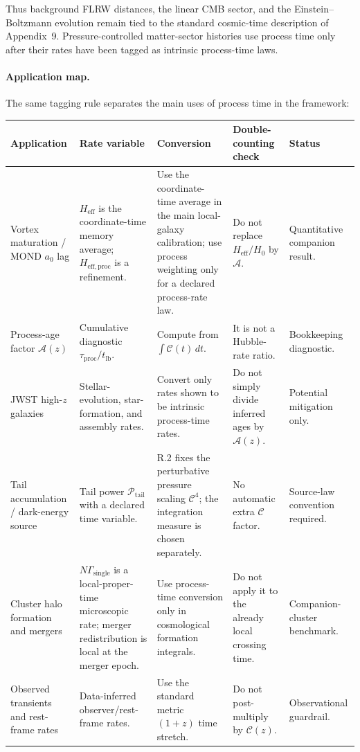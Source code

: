 \documentclass[11pt]{article}
\begin{document}
Thus background FLRW distances, the linear CMB sector, and the
Einstein--Boltzmann evolution remain tied to the standard cosmic-time
description of Appendix~9.  Pressure-controlled matter-sector histories
use process time only after their rates have been tagged as intrinsic
process-time laws.

\paragraph{Application map.}
The same tagging rule separates the main uses of process time in the
framework:
\begin{center}
\small
\begin{tabular}{@{}p{}p{}p{}p{}p{}@{}}
\hline
\textbf{Application} & \textbf{Rate variable} & \textbf{Conversion} & \textbf{Double-counting check} & \textbf{Status} \\
\hline
Vortex maturation / MOND $a_0$ lag &
$H_{\mathrm{eff}}$ is the coordinate-time memory average; $H_{\mathrm{eff,proc}}$ is a refinement. &
Use the coordinate-time average in the main local-galaxy calibration; use process weighting only for a declared process-rate law. &
Do not replace $H_{\mathrm{eff}}/H_0$ by $\mathcal{A}$. &
Quantitative companion result. \\
Process-age factor $\mathcal{A}(z)$ &
Cumulative diagnostic $\tau_{\mathrm{proc}}/t_{\mathrm{lb}}$. &
Compute from $\int \mathcal{C}(t)\,dt$. &
It is not a Hubble-rate ratio. &
Bookkeeping diagnostic. \\
JWST high-$z$ galaxies &
Stellar-evolution, star-formation, and assembly rates. &
Convert only rates shown to be intrinsic process-time rates. &
Do not simply divide inferred ages by $\mathcal{A}(z)$. &
Potential mitigation only. \\
Tail accumulation / dark-energy source &
Tail power $\mathcal{P}_{\mathrm{tail}}$ with a declared time variable. &
R.2 fixes the perturbative pressure scaling $\mathcal{C}^4$; the integration measure is chosen separately. &
No automatic extra $\mathcal{C}$ factor. &
Source-law convention required. \\
Cluster halo formation and mergers &
$N\Gamma_{\mathrm{single}}$ is a local-proper-time microscopic rate; merger redistribution is local at the merger epoch. &
Use process-time conversion only in cosmological formation integrals. &
Do not apply it to the already local crossing time. &
Companion-cluster benchmark. \\
Observed transients and rest-frame rates &
Data-inferred observer/rest-frame rates. &
Use the standard metric $(1+z)$ time stretch. &
Do not post-multiply by $\mathcal{C}(z)$. &
Observational guardrail. \\
\hline
\end{tabular}
\end{center}
\end{document}

